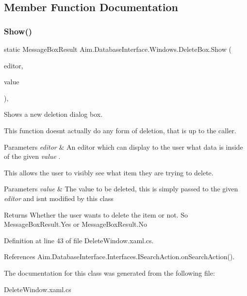 \subsection{Member Function Documentation}
\mbox{\label{class_aim_1_1_database_interface_1_1_windows_1_1_delete_box_a41800b41805d59141dcf13d89aa3cea2}} 
\subsubsection{\texorpdfstring{Show()}{Show()}}
{\footnotesize\ttfamily static Message\+Box\+Result Aim.\+Database\+Interface.\+Windows.\+Delete\+Box.\+Show (\begin{DoxyParamCaption}\item[{\mbox{\hyperlink{interface_aim_1_1_database_interface_1_1_interfaces_1_1_i_editor}{I\+Editor}}}]{editor,  }\item[{object}]{value }\end{DoxyParamCaption})\hspace{0.3cm}{\ttfamily [inline]}, {\ttfamily [static]}}



Shows a new deletion dialog box. 

This function doesn\textquotesingle{}t actually do any form of deletion, that is up to the caller. 


\begin{DoxyParams}{Parameters}
{\em editor} & An editor which can display to the user what data is inside of the given {\itshape value} .\\
\hline
\end{DoxyParams}
This allows the user to visibly see what item they are trying to delete. 


\begin{DoxyParams}{Parameters}
{\em value} & The value to be deleted, this is simply passed to the given {\itshape editor}  and isn\textquotesingle{}t modified by this class \\
\hline
\end{DoxyParams}
\begin{DoxyReturn}{Returns}
Whether the user wants to delete the item or not. So Message\+Box\+Result.\+Yes or Message\+Box\+Result.\+No
\end{DoxyReturn}


Definition at line 43 of file Delete\+Window.\+xaml.\+cs.



References Aim.\+Database\+Interface.\+Interfaces.\+I\+Search\+Action.\+on\+Search\+Action().



The documentation for this class was generated from the following file\+:\begin{DoxyCompactItemize}
\item 
Delete\+Window.\+xaml.\+cs\end{DoxyCompactItemize}
